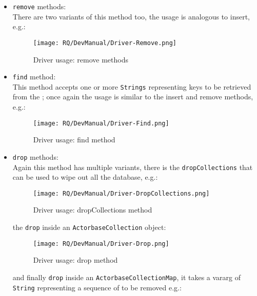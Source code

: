 \documentclass{scalatekids-article}
\begin{document}
\begin{itemize}
\begin{itemize}
  \end{itemize}
\item \verb=remove= methods:\\ There are two variants of this method too, the usage is
  analogous to insert, e.g.:
  \begin{figure}[H]
    \begin{center}
      \texttt{[image: RQ/DevManual/Driver-Remove.png]}
      \caption{Driver usage: remove methods}
    \end{center}
  \end{figure}
\item \verb=find= method:\\ This method accepts one or more \verb=Strings= representing
  keys to be retrieved from the ; once again the usage is similar to the insert and
  remove methods, e.g.:
  \begin{figure}[H]
    \begin{center}
      \texttt{[image: RQ/DevManual/Driver-Find.png]}
      \caption{Driver usage: find method}
    \end{center}
  \end{figure}
\item \verb=drop= methods:\\ Again this method has multiple variants, there is the
  \verb=dropCollections= that can be used to wipe out all the database, e.g.:
  \begin{figure}[H]
    \begin{center}
      \texttt{[image: RQ/DevManual/Driver-DropCollections.png]}
      \caption{Driver usage: dropCollections method}
    \end{center}
  \end{figure}
  the \verb=drop= inside an \verb=ActorbaseCollection= object:
  \begin{figure}[H]
    \begin{center}
      \texttt{[image: RQ/DevManual/Driver-Drop.png]}
      \caption{Driver usage: drop method}
    \end{center}
  \end{figure}
  and finally \verb=drop= inside an \verb=ActorbaseCollectionMap=, it takes a
  vararg of \verb=String= representing a sequence of  to be removed
  e.g.:
  \begin{figure}[H]
    \begin{center}

\end{center}
\end{figure}
\end{itemize}
\end{document}
